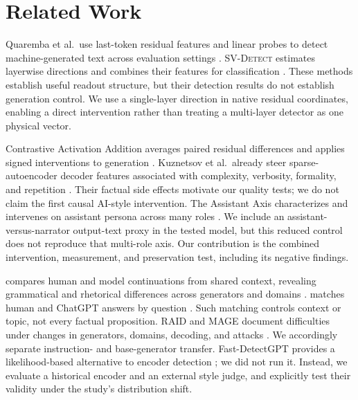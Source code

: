 \section{Related Work}\label{sec:related}
Quaremba et al.\ use last-token residual features and linear probes to detect machine-generated text across evaluation settings \cite{quaremba2026}. \textsc{SV-Detect} estimates layerwise directions and combines their features for classification \cite{vishnyakov2026}. These methods establish useful readout structure, but their detection results do not establish generation control. We use a single-layer direction in native residual coordinates, enabling a direct intervention rather than treating a multi-layer detector as one physical vector.

Contrastive Activation Addition averages paired residual differences and applies signed interventions to generation \cite{rimsky2024}. Kuznetsov et al.\ already steer sparse-autoencoder decoder features associated with complexity, verbosity, formality, and repetition \cite{kuznetsov2025}. Their factual side effects motivate our quality tests; we do not claim the first causal AI-style intervention. The Assistant Axis characterizes and intervenes on assistant persona across many roles \cite{lu2026}. We include an assistant-versus-narrator output-text proxy in the tested model, but this reduced control does not reproduce that multi-role axis. Our contribution is the combined intervention, measurement, and preservation test, including its negative findings.

\hape compares human and model continuations from shared context, revealing grammatical and rhetorical differences across generators and domains \cite{reinhart2025}. \hcthree matches human and ChatGPT answers by question \cite{guo2023}. Such matching controls context or topic, not every factual proposition. \textsc{RAID} and \textsc{MAGE} document difficulties under changes in generators, domains, decoding, and attacks \cite{dugan2024,li2024}. We accordingly separate instruction- and base-generator transfer. Fast-DetectGPT provides a likelihood-based alternative to encoder detection \cite{bao2024}; we did not run it. Instead, we evaluate a historical encoder and an external style judge, and explicitly test their validity under the study's distribution shift.
